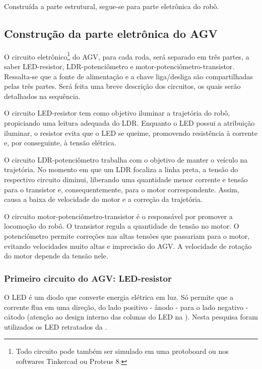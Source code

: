 \documentclass{textolivre}
\begin{document}
Construída a parte estrutural, segue-se para parte eletrônica do robô.


\subsection{Construção da parte eletrônica do AGV}\label{sec-constr-eletr}
O circuito eletrônico\footnote{Todo circuito pode também ser simulado em uma
protoboard ou nos softwares Tinkercad ou Proteus 8.} do AGV, para cada roda,
será separado em três partes, a saber LED-resistor, LDR-potenciômetro e
motor-potenciômetro-transistor. Ressalta-se que a fonte de alimentação e a
chave liga/desliga são compartilhadas pelas três partes. Será feita uma breve
descrição dos circuitos, os quais serão detalhados na sequência.

O circuito LED-resistor tem como objetivo iluminar a trajetória do robô,
propiciando uma leitura adequada do LDR. Enquanto o LED possui a atribuição
iluminar, o resistor evita que o LED se queime, promovendo resistência à
corrente e, por conseguinte, à tensão elétrica.

O circuito LDR-potenciômetro trabalha com o objetivo de manter o veículo na
trajetória. No momento em que um LDR focaliza a linha preta, a tensão do
respectivo circuito diminui, liberando uma quantidade menor corrente e tensão
para o transistor e, consequentemente, para o motor correspondente. Assim,
causa a baixa de velocidade do motor e a correção da trajetória.

O circuito motor-potenciômetro-transistor é o responsável por promover a
locomoção do robô. O transistor regula a quantidade de tensão no motor. O
potenciômetro permite correções nas altas tensões que passariam para o motor,
evitando velocidades muito altas e imprecisão do AGV. A velocidade de rotação do motor depende da tensão nele.


\subsubsection{Primeiro circuito do AGV: LED-resistor}\label{sec-prim-circ}
O LED é um diodo que converte energia elétrica em luz. Só permite que a
corrente flua em uma direção, do lado positivo - ânodo - para o lado negativo -
cátodo (atenção ao design interno das colunas do LED na ). Nesta
pesquisa foram utilizados os LED retratados da .
\end{document}
